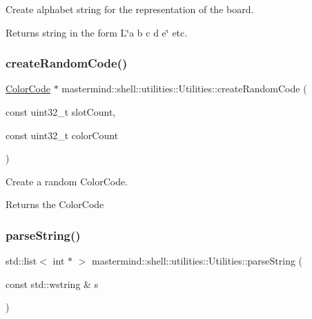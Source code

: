 Create alphabet string for the representation of the board. 

\begin{DoxyReturn}{Returns}
string in the form L\char`\"{}a b c d e\char`\"{} etc. 
\end{DoxyReturn}
\hypertarget{classmastermind_1_1shell_1_1utilities_1_1_utilities_a023c76d90d0588949e26358c3f273219}{}\label{classmastermind_1_1shell_1_1utilities_1_1_utilities_a023c76d90d0588949e26358c3f273219} 
\subsubsection{\texorpdfstring{create\+Random\+Code()}{createRandomCode()}}
{\footnotesize\ttfamily \hyperlink{classmastermind_1_1logic_1_1_color_code}{Color\+Code} $\ast$ mastermind\+::shell\+::utilities\+::\+Utilities\+::create\+Random\+Code (\begin{DoxyParamCaption}\item[{const uint32\+\_\+t}]{slot\+Count,  }\item[{const uint32\+\_\+t}]{color\+Count }\end{DoxyParamCaption})\hspace{0.3cm}{\ttfamily [static]}}



Create a random Color\+Code. 

\begin{DoxyReturn}{Returns}
the Color\+Code 
\end{DoxyReturn}
\hypertarget{classmastermind_1_1shell_1_1utilities_1_1_utilities_ab364b032c0a68c7a0dbd5696b23d23b0}{}\label{classmastermind_1_1shell_1_1utilities_1_1_utilities_ab364b032c0a68c7a0dbd5696b23d23b0} 
\subsubsection{\texorpdfstring{parse\+String()}{parseString()}}
{\footnotesize\ttfamily std\+::list$<$ int $\ast$ $>$ mastermind\+::shell\+::utilities\+::\+Utilities\+::parse\+String (\begin{DoxyParamCaption}\item[{const std\+::wstring \&}]{s }\end{DoxyParamCaption})\hspace{0.3cm}{\ttfamily [static]}}



